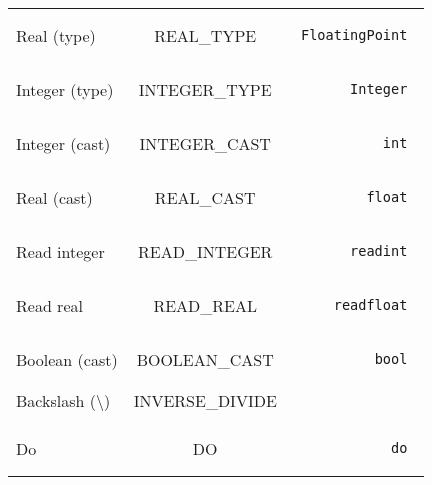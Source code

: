 \documentclass[a4paper,10pt]{article}
\begin{document}
\begin{tabular}{|l|c|r|}
  Real (type) & REAL\_TYPE & \begin{minipage}{2in} \begin{verbatim} FloatingPoint \end{verbatim} \end{minipage} \\
  Integer (type) & INTEGER\_TYPE & \begin{minipage}{2in} \begin{verbatim} Integer \end{verbatim} \end{minipage} \\
  Integer (cast) & INTEGER\_CAST & \begin{minipage}{2in} \begin{verbatim} int \end{verbatim} \end{minipage} \\
  Real (cast) & REAL\_CAST & \begin{minipage}{2in} \begin{verbatim} float \end{verbatim} \end{minipage} \\
  Read integer & READ\_INTEGER & \begin{minipage}{2in} \begin{verbatim} readint \end{verbatim} \end{minipage} \\
  Read real & READ\_REAL & \begin{minipage}{2in} \begin{verbatim} readfloat \end{verbatim} \end{minipage} \\
  Boolean (cast) & BOOLEAN\_CAST & \begin{minipage}{2in} \begin{verbatim} bool \end{verbatim} \end{minipage} \\
Backslash (\textbackslash) & INVERSE\_DIVIDE & \begin{minipage}{2in} \begin{verbatim} \\ \end{verbatim} \end{minipage} \\
Do & DO & \begin{minipage}{2in} \begin{verbatim} do \end{verbatim} \end{minipage} \\

\end{tabular}
\end{document}
